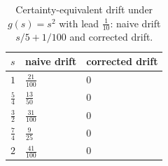 \begin{table}[H]
\centering\small
\caption{Certainty-equivalent drift under $g(s)=s^2$ with lead $\tfrac1{10}$: naive drift $s/5+1/100$ and corrected drift.}
\label{tab:drift}
\begin{tabular}{lll}
\toprule
$s$ & naive drift & corrected drift \\
\midrule
$1$ & $\tfrac{21}{100}$ & $0$ \\
$\tfrac{5}{4}$ & $\tfrac{13}{50}$ & $0$ \\
$\tfrac{3}{2}$ & $\tfrac{31}{100}$ & $0$ \\
$\tfrac{7}{4}$ & $\tfrac{9}{25}$ & $0$ \\
$2$ & $\tfrac{41}{100}$ & $0$ \\
\bottomrule
\end{tabular}
\end{table}
